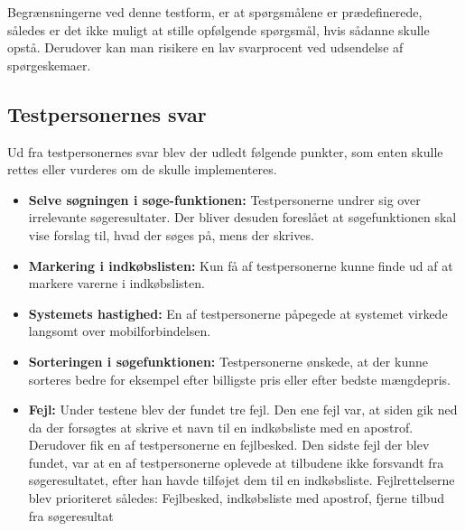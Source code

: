Begrænsningerne ved denne testform, er at spørgsmålene er prædefinerede, således er det ikke muligt at stille opfølgende spørgsmål, hvis sådanne skulle opstå. Derudover kan man risikere en lav svarprocent ved udsendelse af spørgeskemaer.

\subsection{Testpersonernes svar}
Ud fra testpersonernes svar blev der udledt følgende punkter, som enten skulle rettes eller vurderes om de skulle implementeres.
\begin{itemize}

\item \textbf{Selve søgningen i søge-funktionen:}
Testpersonerne undrer sig over irrelevante søgeresultater. Der bliver desuden foreslået at søgefunktionen skal vise forslag til, hvad der søges på, mens der skrives. 


\item \textbf{Markering i indkøbslisten:}
Kun få af testpersonerne kunne finde ud af at markere varerne i indkøbslisten. 


\item \textbf{Systemets hastighed:}
En af testpersonerne påpegede at systemet virkede langsomt over mobilforbindelsen.


\item \textbf{Sorteringen i søgefunktionen:}
Testpersonerne ønskede, at der kunne sorteres bedre for eksempel efter billigste pris eller efter bedste mængdepris.





\item \textbf{Fejl:}
Under testene blev der fundet tre fejl. Den ene fejl var, at siden gik ned da der forsøgtes at skrive et navn til en indkøbsliste med en apostrof. Derudover fik en af testpersonerne en fejlbesked. Den sidste fejl der blev fundet, var at en af testpersonerne oplevede at tilbudene ikke forsvandt fra søgeresultatet, efter han havde tilføjet dem til en indkøbsliste. Fejlrettelserne blev prioriteret således:  Fejlbesked, indkøbsliste med apostrof, fjerne tilbud fra søgeresultat




\end{itemize}
